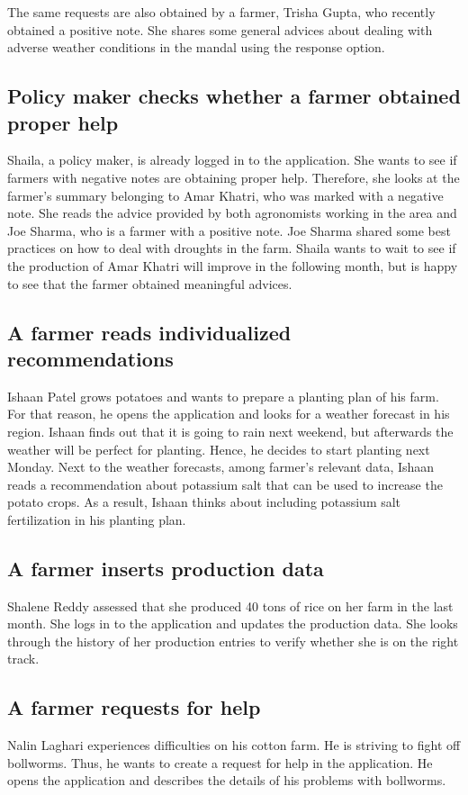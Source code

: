 The same requests are also obtained by a farmer, Trisha Gupta, who  recently obtained a positive note. She shares some general advices about dealing with adverse weather conditions in the mandal using the response option.

\subsection*{Policy maker checks whether a farmer obtained proper help}
Shaila, a policy maker, is already logged in to the application. She wants to see if farmers with negative notes are obtaining proper help. Therefore, she looks at the farmer's summary belonging to Amar Khatri, who was marked with a negative note. She reads the advice provided by both agronomists working in the area and Joe Sharma, who is a farmer with a positive note. Joe Sharma shared some best practices on how to deal with droughts in the farm. Shaila wants to wait to see if the production of Amar Khatri will improve in the following month, but is happy to see that the farmer obtained meaningful advices.

\subsection*{A farmer reads individualized recommendations}
Ishaan Patel grows potatoes and wants to prepare a planting plan of his farm. For that reason, he opens the application and looks for a weather forecast in his region. Ishaan finds out that it is going to rain next weekend, but afterwards the weather will be perfect for planting. Hence, he decides to start planting next Monday. Next to the weather forecasts, among farmer's relevant data, Ishaan reads a recommendation about potassium salt that can be used to increase the potato crops. As a result, Ishaan thinks about including potassium salt fertilization in his planting plan. 

\subsection*{A farmer inserts production data}
Shalene Reddy assessed that she produced 40 tons of rice on her farm in the last month. She logs in to the application and updates the production data. She looks through the history of her production entries to verify whether she is on the right track. 

\subsection*{A farmer requests for help}
Nalin Laghari experiences difficulties on his cotton farm. He is striving to fight off bollworms. Thus, he wants to create a request for help in the application. He opens the application and describes the details of his problems with bollworms.

